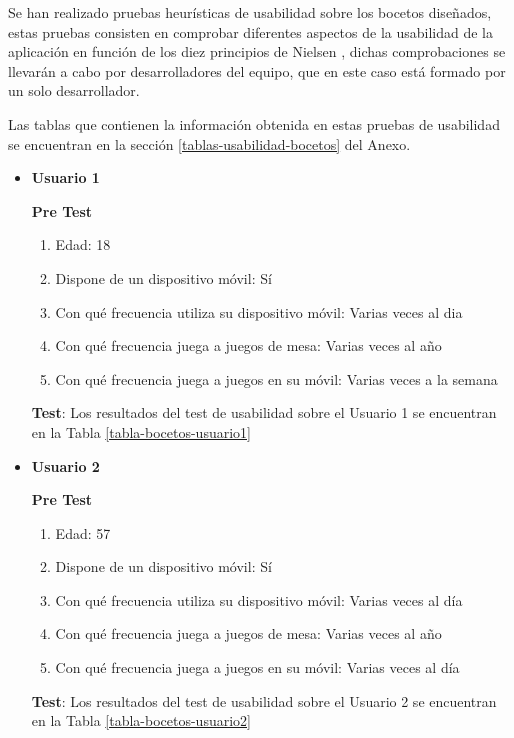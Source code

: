 Se han realizado pruebas heurísticas de usabilidad sobre los bocetos diseñados, estas pruebas consisten en comprobar diferentes aspectos de la usabilidad de la aplicación en función de los diez principios de Nielsen \cite{nielsen}, dichas comprobaciones se llevarán a cabo por desarrolladores del equipo, que en este caso está formado por un solo desarrollador.

Las tablas que contienen la información obtenida en estas pruebas de usabilidad se encuentran en la sección \ref{tablas-usabilidad-bocetos} del Anexo.

\begin{itemize}
  \item \textbf{Usuario 1}

  \textbf{Pre Test}

  \begin{enumerate}
    \item Edad: 18
    \item Dispone de un dispositivo móvil: Sí
    \item Con qué frecuencia utiliza su dispositivo móvil: Varias veces al dia
    \item Con qué frecuencia juega a juegos de mesa: Varias veces al año
    \item Con qué frecuencia juega a juegos en su móvil: Varias veces a la semana
  \end{enumerate}

  \textbf{Test}: Los resultados del test de usabilidad sobre el Usuario 1 se encuentran en la Tabla \ref{tabla-bocetos-usuario1}


  \item \textbf{Usuario 2}

  \textbf{Pre Test}

  \begin{enumerate}
    \item Edad: 57
    \item Dispone de un dispositivo móvil: Sí
    \item Con qué frecuencia utiliza su dispositivo móvil: Varias veces al día
    \item Con qué frecuencia juega a juegos de mesa: Varias veces al año
    \item Con qué frecuencia juega a juegos en su móvil: Varias veces al día
  \end{enumerate}

  \textbf{Test}: Los resultados del test de usabilidad sobre el Usuario 2 se encuentran en la Tabla \ref{tabla-bocetos-usuario2}



\end{itemize}
